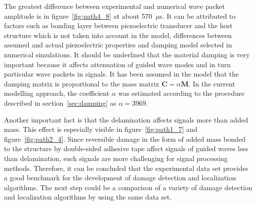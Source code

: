 \documentclass[12pt]{iopart}
\newcommand{\bm}[1]{\mathbf{#1}}
\begin{document}
The greatest difference between experimental and numerical wave packet amplitude is in figure~\ref{fig:path4_8} at about 570~\(\mu\)s. It can be attributed to factors such as bonding layer between piezoelectric transducer and the host structure which is not taken into account in the model, differences between assumed and actual piezoelectric properties and damping model selected in numerical simulations. It should be underlined that the material damping is very important because it affects attenuation of guided wave modes and in turn particular wave packets in signals. It has been assumed in the model that the damping matrix is proportional to the mass matrix \(\bm{C} = \alpha \bm{M}\). In the current modelling approach, the coefficient \(\alpha\) was estimated according to the procedure described in section~\ref{sec:damping} as \(\alpha = 3969\). 

Another important fact is that the delamination affects signals more than added mass. This effect is especially visible in figure~\ref{fig:path1_7} and figure~\ref{fig:path2_4}. Since reversible damage in the form of added mass bonded to the structure by double-sided adhesive tape affect signals of guided waves less than delamination, such signals are more challenging for signal processing methods. Therefore, it can be concluded that the experimental data set provides a good benchmark for the development of damage detection and localization algorithms. The next step could be a comparison of a variety of damage detection and localization algorithms by using the same data set.
\end{document}

